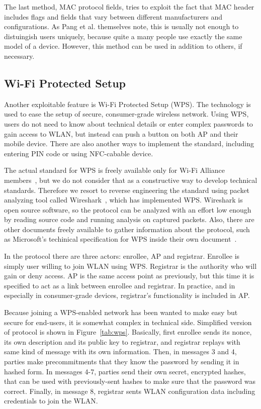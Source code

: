 \documentclass[12pt,a4paper,oneside,pdftex]{report}
\begin{document}
The last method, MAC protocol fields, tries to exploit the fact that MAC header includes flags and fields that vary between different manufacturers and configurations. As Pang et al. themselves note, this is usually not enough to distuingish users uniquely, because quite a many people use exactly the same model of a device. However, this method can be used in addition to others, if necessary.


\subsection{Wi-Fi Protected Setup}

Another exploitable feature is Wi-Fi Protected Setup (WPS). The technology is used to ease the setup of secure, consumer-grade wireless network. Using WPS, users do not need to know about technical details or enter complex passwords to gain access to WLAN, but instead can push a button on both AP and their mobile device. There are also another ways to implement the standard, including entering PIN code or using NFC-cabable device.~\cite{alliance2007wi}

The actual standard for WPS is freely available only for Wi-Fi Alliance members~\cite{alliance2007wi}, but we do not consider that as a constructive way to develop technical standards. Therefore we resort to reverse engineering the standard using packet analyzing tool called Wireshark~\cite{wireshark}, which has implemented WPS. Wireshark is open source software, so the protocol can be analyzed with an effort low enough by reading source code and running analysis on captured packets. Also, there are other documents freely available to gather information about the protocol, such as Microsoft's techinical specification for WPS inside their own document~\cite{microsoftWCN}.

In the protocol there are three actors: enrollee, AP and registrar. Enrollee is simply user willing to join WLAN using WPS. Registrar is the authority who will gain or deny access. AP is the same access point as previously, but this time it is specified to act as a link between enrollee and registrar. In practice, and in especially in consumer-grade devices, registrar's functionality is included in AP. 

Because joining a WPS-enabled network has been wanted to make easy but secure for end-users, it is somewhat complex in technical side. Simplified version of protocol is shown in Figure~\ref{tab:wps}. Basically, first enrollee sends its nonce, its own description and its public key to registrar, and registrar replays with same kind of message with its own information. Then, in messages 3 and 4, parties make precommitments that they know the password by sending it in hashed form. In messages 4-7, parties send their own secret, encrypted hashes, that can be used with previously-sent hashes to make sure that the password was correct. Finally, in message 8, registrar sents WLAN configuration data including credentials to join the WLAN.
\end{document}
